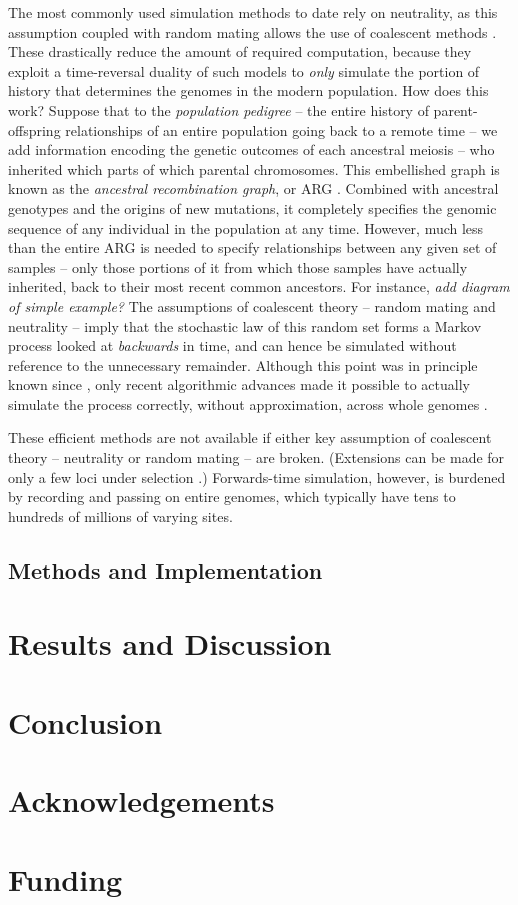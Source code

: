 \documentclass{bioinfo}
\newcommand{\plr}[1]{{\color{blue}\it #1}}
\begin{document}
The most commonly used simulation methods to date rely on neutrality,
as this assumption coupled with random mating allows the use of coalescent methods \citep{wakeley}.
These drastically reduce the amount of required computation,
because they exploit a time-reversal duality of such models
to \emph{only} simulate the portion of history that determines the genomes in the modern population.
How does this work?
Suppose that to the \emph{population pedigree} --
the entire history of parent-offspring relationships of an entire population going back to a remote time --
we add information encoding the genetic outcomes of each ancestral meiosis --
who inherited which parts of which parental chromosomes.
This embellished graph is known as the \emph{ancestral recombination graph}, or ARG \citep{griffiths}.
Combined with ancestral genotypes and the origins of new mutations,
it completely specifies the genomic sequence of any individual in the population at any time.
However, much less than the entire ARG is needed to specify relationships between any given set of samples --
only those portions of it from which those samples have actually inherited, back to their most recent common ancestors.
For instance, \plr{add diagram of simple example?}
The assumptions of coalescent theory -- random mating and neutrality --
imply that the stochastic law of this random set forms a Markov process looked at \emph{backwards} in time,
and can hence be simulated without reference to the unnecessary remainder.
Although this point was in principle known since \citet{griffithsmarjoram},
only recent algorithmic advances made it possible to actually simulate the process correctly,
without approximation, across whole genomes \citep{msprime}.

These efficient methods are not available if either key assumption of coalescent theory --
neutrality or random mating -- are broken.
(Extensions can be made for only a few loci under selection \citep{hudson,krone}.)
Forwards-time simulation, however, is burdened by recording and passing on entire genomes,
which typically have tens to hundreds of millions of varying sites.


\begin{methods}
\section{Methods and Implementation}

\end{methods}
\section{Results and Discussion}



\section{Conclusion}

\section*{Acknowledgements}

\section*{Funding}



\end{document}
